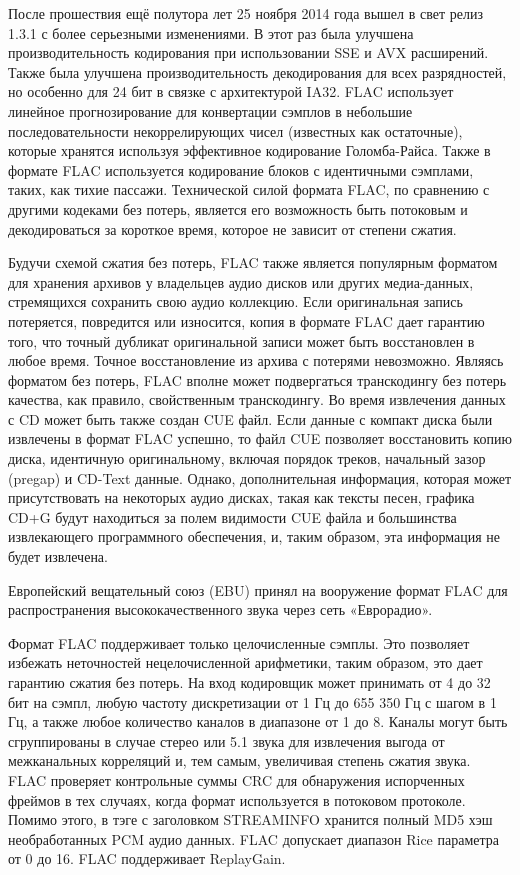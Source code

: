 \documentclass[12pt,a4paper,oneside]{report}
\begin{document}
После прошествия ещё полутора лет 25 ноября 2014 года вышел в свет релиз 1.3.1 с более серьезными изменениями. В этот раз была улучшена производительность кодирования при использовании SSE и AVX расширений. Также была улучшена производительность декодирования для всех разрядностей, но особенно для 24 бит в связке с архитектурой IA32.
FLAC использует линейное прогнозирование для конвертации сэмплов в небольшие последовательности некоррелирующих чисел (известных как остаточные), которые хранятся используя эффективное кодирование Голомба-Райса. Также в формате FLAC используется кодирование блоков с идентичными сэмплами, таких, как тихие пассажи. Технической силой формата FLAC, по сравнению с другими кодеками без потерь, является его возможность быть потоковым и декодироваться за короткое время, которое не зависит от степени сжатия.

Будучи схемой сжатия без потерь, FLAC также является популярным форматом для хранения архивов у владельцев аудио дисков или других медиа-данных, стремящихся сохранить свою аудио коллекцию. Если оригинальная запись потеряется, повредится или износится, копия в формате FLAC дает гарантию того, что точный дубликат оригинальной записи может быть восстановлен в любое время. Точное восстановление из архива с потерями невозможно. Являясь форматом без потерь, FLAC вполне может подвергаться транскодингу без потерь качества, как правило, свойственным транскодингу. Во время извлечения данных с CD может быть также создан CUE файл. Если данные с компакт диска были извлечены в формат FLAC успешно, то файл CUE позволяет восстановить копию диска, идентичную оригинальному, включая порядок треков, начальный зазор (pregap) и CD-Text данные. Однако, дополнительная информация, которая может присутствовать на некоторых аудио дисках, такая как тексты песен, графика CD+G будут находиться за полем видимости CUE файла и большинства извлекающего программного обеспечения, и, таким образом, эта информация не будет извлечена.

Европейский вещательный союз (EBU) принял на вооружение формат FLAC для распространения высококачественного звука через сеть «Еврорадио».

Формат FLAC поддерживает только целочисленные сэмплы. Это позволяет избежать неточностей нецелочисленной арифметики, таким образом, это дает гарантию сжатия без потерь. На вход кодировщик может принимать от 4 до 32 бит на сэмпл, любую частоту дискретизации от 1 Гц до 655 350 Гц с шагом в 1 Гц, а также любое количество каналов в диапазоне от 1 до 8. Каналы могут быть сгруппированы в случае стерео или 5.1 звука для извлечения выгода от межканальных корреляций и, тем самым, увеличивая степень сжатия звука. FLAC проверяет контрольные суммы CRC для обнаружения испорченных фреймов в тех случаях, когда формат используется в потоковом протоколе. Помимо этого, в тэге с заголовком STREAMINFO хранится полный MD5 хэш необработанных PCM аудио данных. FLAC допускает диапазон Rice параметра от 0 до 16. FLAC поддерживает ReplayGain.
\end{document}
